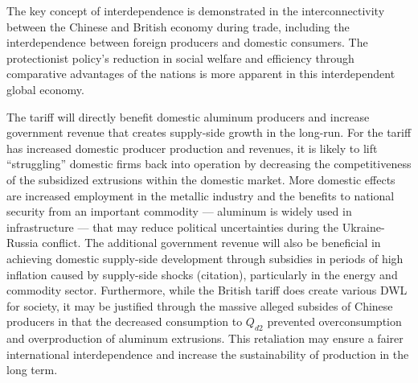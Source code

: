 \documentclass[a4paper,12pt]{article}
\begin{document}
The key concept of interdependence is demonstrated in the interconnectivity between the Chinese and British economy during trade, including the interdependence between foreign producers and domestic consumers. The protectionist policy's reduction in social welfare and efficiency through comparative advantages of the nations is more apparent in this interdependent global economy.


The tariff will directly benefit domestic aluminum producers and increase government revenue that creates supply-side growth in the long-run. For the tariff has increased domestic producer production and revenues, it is likely to lift ``struggling'' domestic firms back into operation by decreasing the competitiveness of the subsidized extrusions within the domestic market. More domestic effects are increased employment in the metallic industry and the benefits to national security from an important commodity --- aluminum is widely used in infrastructure --- that may reduce political uncertainties during the Ukraine-Russia conflict. The additional government revenue will also be beneficial in achieving domestic supply-side development through subsidies in periods of high inflation caused by supply-side shocks (citation), particularly in the energy and commodity sector. Furthermore, while the British tariff does create various DWL for society, it may be justified through the massive alleged subsides of Chinese producers in that the decreased consumption to $Q_{d2}$ prevented overconsumption and overproduction of aluminum extrusions. This retaliation may ensure a fairer international interdependence and increase the sustainability of production in the long term.
\end{document}

